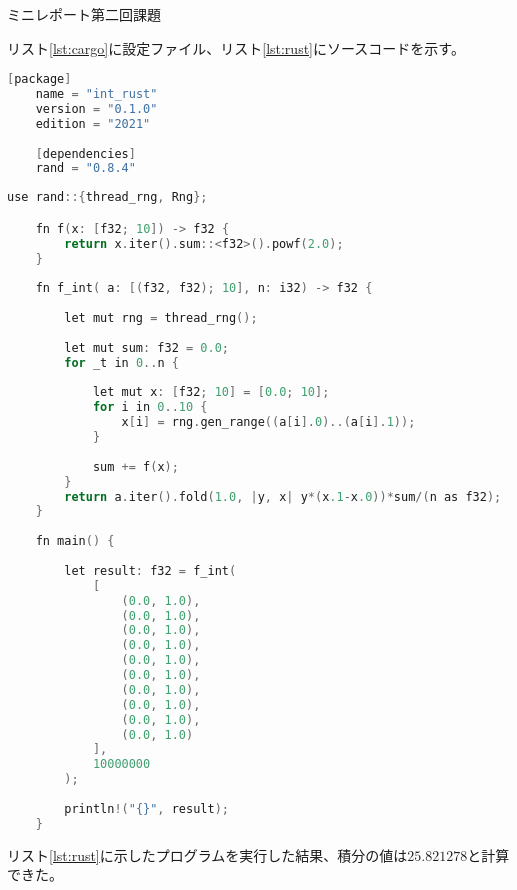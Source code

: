 \documentclass[dvipdfmx]{jsarticle}
\begin{document}
\makeatletter %


\renewcommand{\thefigure}{\thesection.\arabic{figure}}


\makeatother %

\centerline{
    \huge
    ミニレポート第二回課題
}

リスト\ref{lst:cargo}に設定ファイル、リスト\ref{lst:rust}にソースコードを示す。

\begin{lstlisting}[caption=Cargo.toml, label=lst:cargo, language=C]
    [package]
    name = "int_rust"
    version = "0.1.0"
    edition = "2021"
    
    [dependencies]
    rand = "0.8.4"
\end{lstlisting}

\begin{lstlisting}[caption=mian.rs, label=lst:rust, language=C]
    use rand::{thread_rng, Rng};

    fn f(x: [f32; 10]) -> f32 {
        return x.iter().sum::<f32>().powf(2.0);
    }
    
    fn f_int( a: [(f32, f32); 10], n: i32) -> f32 {
    
        let mut rng = thread_rng();
    
        let mut sum: f32 = 0.0;
        for _t in 0..n {
                
            let mut x: [f32; 10] = [0.0; 10];
            for i in 0..10 {
                x[i] = rng.gen_range((a[i].0)..(a[i].1));
            }
    
            sum += f(x);
        }
        return a.iter().fold(1.0, |y, x| y*(x.1-x.0))*sum/(n as f32);
    }
    
    fn main() {
        
        let result: f32 = f_int(
            [
                (0.0, 1.0),
                (0.0, 1.0),
                (0.0, 1.0),
                (0.0, 1.0),
                (0.0, 1.0),
                (0.0, 1.0),
                (0.0, 1.0),
                (0.0, 1.0),
                (0.0, 1.0),
                (0.0, 1.0)
            ],
            10000000
        );
    
        println!("{}", result);
    }    
\end{lstlisting}


リスト\ref{lst:rust}に示したプログラムを実行した結果、積分の値は$25.821278$と計算できた。
\end{document}
